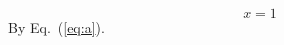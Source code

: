 \documentclass{article}
\begin{document}
\begin{equation} x=1 \label{eq:a}\end{equation}
By Eq.~(\ref{eq:a}).
\end{document}
